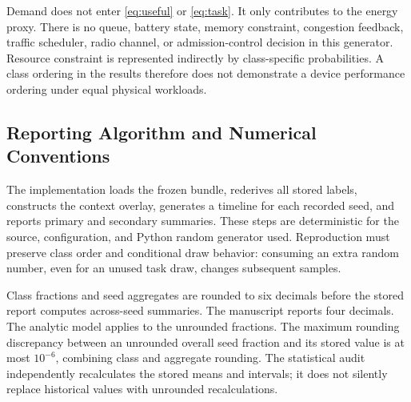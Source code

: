 Demand does not enter \eqref{eq:useful} or \eqref{eq:task}. It only contributes to the energy proxy. There is no queue, battery state, memory constraint, congestion feedback, traffic scheduler, radio channel, or admission-control decision in this generator. Resource constraint is represented indirectly by class-specific probabilities. A class ordering in the results therefore does not demonstrate a device performance ordering under equal physical workloads.

\subsection{Reporting Algorithm and Numerical Conventions}
The implementation loads the frozen bundle, rederives all stored labels, constructs the context overlay, generates a timeline for each recorded seed, and reports primary and secondary summaries. These steps are deterministic for the source, configuration, and Python random generator used. Reproduction must preserve class order and conditional draw behavior: consuming an extra random number, even for an unused task draw, changes subsequent samples.

Class fractions and seed aggregates are rounded to six decimals before the stored report computes across-seed summaries. The manuscript reports four decimals. The analytic model applies to the unrounded fractions. The maximum rounding discrepancy between an unrounded overall seed fraction and its stored value is at most $10^{-6}$, combining class and aggregate rounding. The statistical audit independently recalculates the stored means and intervals; it does not silently replace historical values with unrounded recalculations.
